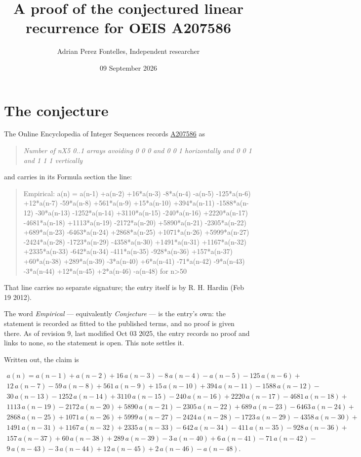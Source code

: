 \documentclass[11pt]{article}
\title{A proof of the conjectured linear recurrence for OEIS A207586}
\author{Adrian Perez Fontelles, Independent researcher}
\date{09 September 2026}
\theoremstyle{definition}
\begin{document}
\maketitle
\section{The conjecture}

The Online Encyclopedia of Integer Sequences records \href{https://oeis.org/A207586}{A207586} as

\begin{quote}\itshape Number of nX5 0..1 arrays avoiding 0 0 0 and 0 0 1 horizontally and 0 0 1 and 1 1 1 vertically\end{quote}

and carries in its Formula section the line:

\begin{quote}\ttfamily Empirical: a(n) = a(n-1) +a(n-2) +16*a(n-3) -8*a(n-4) -a(n-5) -125*a(n-6) +12*a(n-7) -59*a(n-8) +561*a(n-9) +15*a(n-10) +394*a(n-11) -1588*a(n-12) -30*a(n-13) -1252*a(n-14) +3110*a(n-15) -240*a(n-16) +2220*a(n-17) -4681*a(n-18) +1113*a(n-19) -2172*a(n-20) +5890*a(n-21) -2305*a(n-22) +689*a(n-23) -6463*a(n-24) +2868*a(n-25) +1071*a(n-26) +5999*a(n-27) -2424*a(n-28) -1723*a(n-29) -4358*a(n-30) +1491*a(n-31) +1167*a(n-32) +2335*a(n-33) -642*a(n-34) -411*a(n-35) -928*a(n-36) +157*a(n-37) +60*a(n-38) +289*a(n-39) -3*a(n-40) +6*a(n-41) -71*a(n-42) -9*a(n-43) -3*a(n-44) +12*a(n-45) +2*a(n-46) -a(n-48) for n>50\end{quote}

That line carries no separate signature; the entry itself is by R. H. Hardin (Feb 19 2012).

The word {\itshape Empirical} --- equivalently {\itshape Conjecture} --- is the entry's own: the statement is recorded as fitted to the published terms, and no proof is given there. As of revision 9, last modified Oct 03 2025, the entry records no proof and links to none, so the statement is open. This note settles it.

Written out, the claim is

\begin{multline*} a(n) = a(n-1) + a(n-2) + 16\,a(n-3) - 8\,a(n-4) - a(n-5) - 125\,a(n-6) + \\ 12\,a(n-7) - 59\,a(n-8) + 561\,a(n-9) + 15\,a(n-10) + 394\,a(n-11) - 1588\,a(n-12) - \\ 30\,a(n-13) - 1252\,a(n-14) + 3110\,a(n-15) - 240\,a(n-16) + 2220\,a(n-17) - 4681\,a(n-18) + \\ 1113\,a(n-19) - 2172\,a(n-20) + 5890\,a(n-21) - 2305\,a(n-22) + 689\,a(n-23) - 6463\,a(n-24) + \\ 2868\,a(n-25) + 1071\,a(n-26) + 5999\,a(n-27) - 2424\,a(n-28) - 1723\,a(n-29) - 4358\,a(n-30) + \\ 1491\,a(n-31) + 1167\,a(n-32) + 2335\,a(n-33) - 642\,a(n-34) - 411\,a(n-35) - 928\,a(n-36) + \\ 157\,a(n-37) + 60\,a(n-38) + 289\,a(n-39) - 3\,a(n-40) + 6\,a(n-41) - 71\,a(n-42) - \\ 9\,a(n-43) - 3\,a(n-44) + 12\,a(n-45) + 2\,a(n-46) - a(n-48). \end{multline*}
\end{document}
